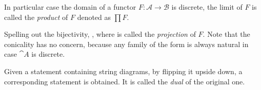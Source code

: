 \begin{definition}[Product]
In particular case the domain of a functor $F : \mathcal{A} \to \mathcal{B}$ is discrete, %
the limit of $F$ is called the \emph{product }of $F$ denoted as $\textstyle\prod F$. %
\end{definition}
Spelling out the bijectivity,
, where \! is called the \emph{projection} of $F$. 
\mynewline
Note that the conicality has no concern, because any family of the form
is always natural in case $\cat A$ is discrete.

\begin{definition}[Dual]
Given a statement containing string diagrams, by flipping it upside down, %
a corresponding statement is obtained. It is called the \emph{dual} of the original one.
\end{definition}

